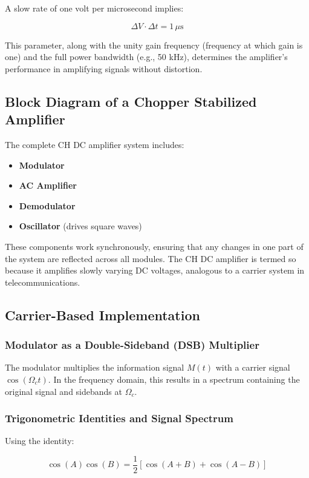 \documentclass[a4paper,9pt,twoside,openany,twocolumn]{memoir}
\begin{document}
A slow rate of one volt per microsecond implies:

\[
\Delta V \cdot \Delta t = 1 \, \mu\text{s}
\]

This parameter, along with the unity gain frequency (frequency at which gain is one) and the full power bandwidth (e.g., 50 kHz), determines the amplifier's performance in amplifying signals without distortion.

\subsection{Block Diagram of a Chopper Stabilized Amplifier}

The complete CH DC amplifier system includes:
\begin{itemize}
    \item \textbf{Modulator}
    \item \textbf{AC Amplifier}
    \item \textbf{Demodulator}
    \item \textbf{Oscillator} (drives square waves)
\end{itemize}

These components work synchronously, ensuring that any changes in one part of the system are reflected across all modules. The CH DC amplifier is termed so because it amplifies slowly varying DC voltages, analogous to a carrier system in telecommunications.

\subsection{Carrier-Based Implementation}

\subsubsection{Modulator as a Double-Sideband (DSB) Multiplier}

The modulator multiplies the information signal \( M(t) \) with a carrier signal \( \cos(\Omega_c t) \). In the frequency domain, this results in a spectrum containing the original signal and sidebands at \( \Omega_c \).

\subsubsection{Trigonometric Identities and Signal Spectrum}

Using the identity:

$$
\cos(A) \cos(B) = \frac{1}{2} \left[ \cos(A+B) + \cos(A-B) \right]
$$
\end{document}
